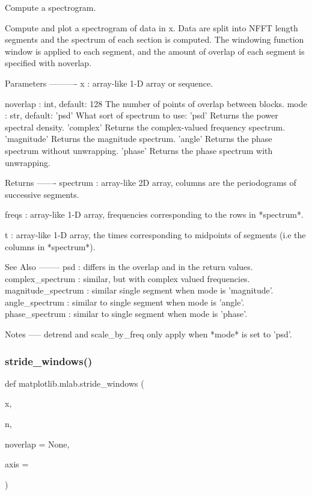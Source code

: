 \begin{DoxyVerb}Compute a spectrogram.

Compute and plot a spectrogram of data in x.  Data are split into
NFFT length segments and the spectrum of each section is
computed.  The windowing function window is applied to each
segment, and the amount of overlap of each segment is
specified with noverlap.

Parameters
----------
x : array-like
    1-D array or sequence.



noverlap : int, default: 128
    The number of points of overlap between blocks.
mode : str, default: 'psd'
    What sort of spectrum to use:
        'psd'
            Returns the power spectral density.
        'complex'
            Returns the complex-valued frequency spectrum.
        'magnitude'
            Returns the magnitude spectrum.
        'angle'
            Returns the phase spectrum without unwrapping.
        'phase'
            Returns the phase spectrum with unwrapping.

Returns
-------
spectrum : array-like
    2D array, columns are the periodograms of successive segments.

freqs : array-like
    1-D array, frequencies corresponding to the rows in *spectrum*.

t : array-like
    1-D array, the times corresponding to midpoints of segments
    (i.e the columns in *spectrum*).

See Also
--------
psd : differs in the overlap and in the return values.
complex_spectrum : similar, but with complex valued frequencies.
magnitude_spectrum : similar single segment when mode is 'magnitude'.
angle_spectrum : similar to single segment when mode is 'angle'.
phase_spectrum : similar to single segment when mode is 'phase'.

Notes
-----
detrend and scale_by_freq only apply when *mode* is set to 'psd'.\end{DoxyVerb}
 \mbox{\label{namespacematplotlib_1_1mlab_a80bb47f94fc42f477178fb4e77272c80}} 
\subsubsection{\texorpdfstring{stride\+\_\+windows()}{stride\_windows()}}
{\footnotesize\ttfamily def matplotlib.\+mlab.\+stride\+\_\+windows (\begin{DoxyParamCaption}\item[{}]{x,  }\item[{}]{n,  }\item[{}]{noverlap = {\ttfamily None},  }\item[{}]{axis = {} }\end{DoxyParamCaption})}

